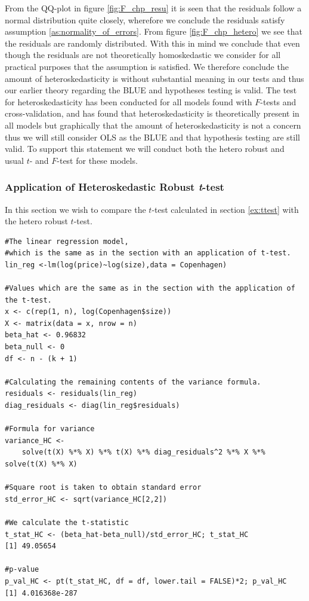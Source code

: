 From the QQ-plot in figure \ref{fig:F_chp_resu} it is seen that the residuals follow a normal distribution quite closely, wherefore we conclude the residuals satisfy assumption \ref{as:normality_of_errors}. 
From  figure \ref{fig:F_chp_hetero} we see that the residuals are randomly distributed. 
With this in mind we conclude that even though the residuals are not theoretically homoskedastic we consider for all practical purposes that the assumption is satisfied.
We therefore conclude the amount of heteroskedasticity is without substantial meaning in our tests and thus our earlier theory regarding the BLUE and hypotheses testing is valid. 
The test for heteroskedasticity has been conducted for all models found with $F$-tests and cross-validation, and has found that heteroskedasticity is theoretically present in all models but graphically that the amount of heteroskedasticity is not a concern thus we will still consider OLS as the BLUE and that hypothesis testing are still valid. 
To support this statement we will conduct both the hetero robust and usual $t$- and $F$-test for these models.

\subsubsection{Application of Heteroskedastic Robust \textit{t}-test}

In this section we wish to compare the $t$-test calculated in section \ref{ex:ttest} with the hetero robust $t$-test. 
\begin{lstlisting}
#The linear regression model, 
#which is the same as in the section with an application of t-test. 
lin_reg <-lm(log(price)~log(size),data = Copenhagen)

#Values which are the same as in the section with the application of the t-test. 
x <- c(rep(1, n), log(Copenhagen$size))
X <- matrix(data = x, nrow = n)
beta_hat <- 0.96832
beta_null <- 0
df <- n - (k + 1)

#Calculating the remaining contents of the variance formula. 
residuals <- residuals(lin_reg)
diag_residuals <- diag(lin_reg$residuals)

#Formula for variance
variance_HC <- 
    solve(t(X) %*% X) %*% t(X) %*% diag_residuals^2 %*% X %*% solve(t(X) %*% X)
    
#Square root is taken to obtain standard error
std_error_HC <- sqrt(variance_HC[2,2])

#We calculate the t-statistic
t_stat_HC <- (beta_hat-beta_null)/std_error_HC; t_stat_HC
[1] 49.05654

#p-value
p_val_HC <- pt(t_stat_HC, df = df, lower.tail = FALSE)*2; p_val_HC
[1] 4.016368e-287
\end{lstlisting}

